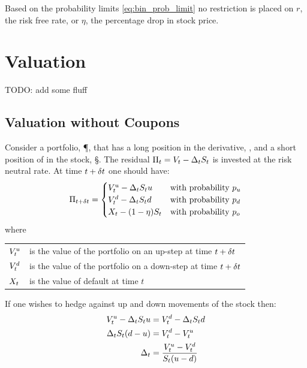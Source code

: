 \documentclass[a4paper,11pt,oneside]{report}
\theoremstyle{plain}
\theoremstyle{definition}
\begin{document}
Based on the probability limits \eqref{eq:bin_prob_limit} no restriction is placed on $r$, the risk free rate, or $\eta$, the percentage drop in stock price.


\section{Valuation}
TODO: add some fluff

\subsection{Valuation without Coupons}
Consider a portfolio, \P, that has a long position in the derivative, \V, and a short position of \D in the stock, \S.  The residual $\Pi_t = V_t - \Delta_tS_t$ is invested at the risk neutral rate.  At time $t + \delta t$ one should have:
\begin{equation*}
 \Pi_{t + \delta t} =
 \begin{cases}
  V^{u}_t - \Delta_tS_t u          & \text{with probability } p_u \\
  V^{d}_t - \Delta_tS_t d          & \text{with probability } p_d\\
  X_t - (1 - \eta)S_t     & \text{with probability } p_o\\
 \end{cases}
\end{equation*}
where

\begin{tabular}{ll}
 $V^{u}_t$          & is the value of the portfolio on an up-step at time $t + \delta t$ \\
 $V^{d}_t$          & is the value of the portfolio on a down-step at time $t + \delta t$ \\
 $X_t$           & is the value of default at time $t$ \\
\end{tabular}

If one wishes to hedge against up and down movements of the stock then:
\begin{align}
    V^{u}_t - \Delta_tS_t u &= V^{d}_t - \Delta_tS_t d \nonumber\\
     \Delta_tS_t(d - u) &= V^{d}_t - V^{u}_t \nonumber\\
              \Delta_t &= \frac{V^{u}_t - V^{d}_t}{S_t(u - d)}
\end{align}
\end{document}
